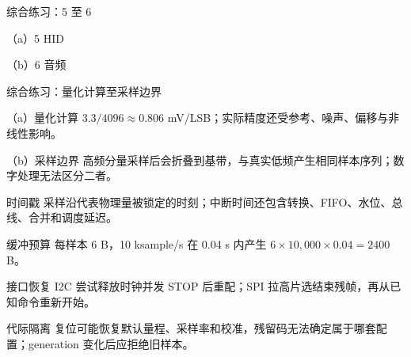 \begin{chapteranswer}{综合练习：5 至 6}
\begin{answersubproblem}{（a）5}
HID
\end{answersubproblem}
\begin{answersubproblem}{（b）6}
音频
\end{answersubproblem}
\end{chapteranswer}

\begin{chapteranswer}{综合练习：量化计算至采样边界}
\begin{answersubproblem}{（a）量化计算}
$3.3/4096\approx0.806$ mV/LSB；实际精度还受参考、噪声、偏移与非线性影响。
\end{answersubproblem}
\begin{answersubproblem}{（b）采样边界}
高频分量采样后会折叠到基带，与真实低频产生相同样本序列；数字处理无法区分二者。
\end{answersubproblem}
\end{chapteranswer}

\begin{chapteranswer}{时间戳}
采样沿代表物理量被锁定的时刻；中断时间还包含转换、FIFO、水位、总线、合并和调度延迟。
\end{chapteranswer}

\begin{chapteranswer}{缓冲预算}
每样本 6 B，10 ksample/s 在 0.04 s 内产生 $6\times10{,}000\times0.04=2400$ B。
\end{chapteranswer}

\begin{chapteranswer}{接口恢复}
I2C 尝试释放时钟并发 STOP 后重配；SPI 拉高片选结束残帧，再从已知命令重新开始。
\end{chapteranswer}

\begin{chapteranswer}{代际隔离}
复位可能恢复默认量程、采样率和校准，残留码无法确定属于哪套配置；generation 变化后应拒绝旧样本。
\end{chapteranswer}

